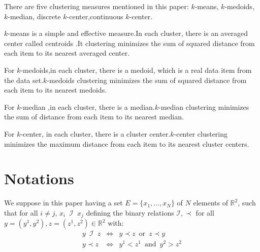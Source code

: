 \documentclass{meta}
\def\RR{{\mathbb{R}}}
\def\CC{{\mathcal{C}}}
\begin{document}
There are five clustering measures mentioned in this paper: $k$-means,  $k$-medoids, $k$-median, discrete $k$-center,continuous  $k$-center.

$k$-means is a simple and effective measure.In each cluster, there is an averaged center called centroids .It clustering minimizes the sum of squared distance from each item to its nearest averaged center.

For $k$-medoids,in each cluster, there is a medoid, which is a real data item from the data set.$k$-medoids clustering minimizes the sum of squared distance from each item to its nearest medoids.

For $k$-median ,in each cluster, there is a median.$k$-median clustering minimizes the sum of distance from each item to its nearest median.

For $k$-center, in each cluster, there is a cluster center.$k$-center clustering minimizes the maximum distance from each item to its nearest cluster centers.





\section{Notations}






We suppose in this paper having a set $E=\{x_1,\dots, x_N\}$ of $N$ elements of $\RR^2$, %
such that for all $ i\neq j$, $x_i \phantom{0} \mathcal{I} \phantom{0} x_j$  
defining the binary relations $\mathcal{I},\prec $  for all $ y=(y^1,y^2),z=(z^1,z^2) \in \RR^2$ with:
\begin{eqnarray}
y \phantom{1}\mathcal{I}\phantom{1} z  & \Longleftrightarrow  &y \prec z  \phantom{2} \mbox{or} \phantom{2}  z \prec y \\
 y \prec z  & \Longleftrightarrow  & y^1< z^1 \phantom{2} \mbox{and}\phantom{2} y^2> z^2
\end{eqnarray}
\end{document}
